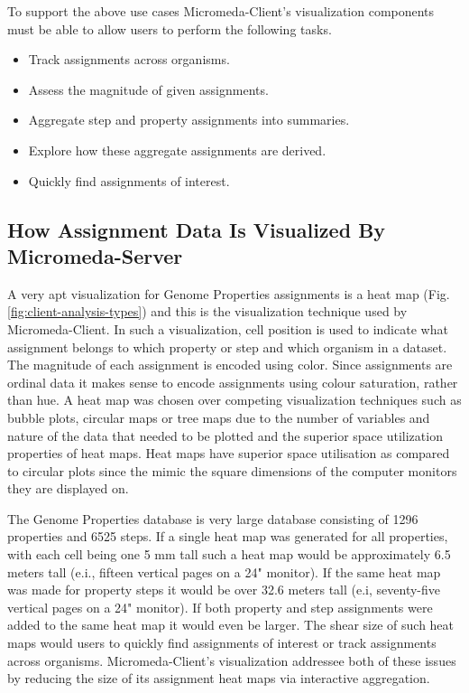 To support the above use cases Micromeda-Client's visualization components must be able to allow users to perform the following tasks.

\begin{itemize}
\item Track assignments across organisms.
\item Assess the magnitude of given assignments.
\item Aggregate step and property assignments into summaries.
\item Explore how these aggregate assignments are derived.
\item Quickly find assignments of interest.
\end{itemize}

\subsection{How Assignment Data Is Visualized By Micromeda-Server}

A very apt visualization for Genome Properties assignments is a heat map (Fig. \ref{fig:client-analysis-types}) and this is the visualization technique used by Micromeda-Client. In such a visualization, cell position is used to indicate what assignment belongs to which property or step and which organism in a dataset. The magnitude of each assignment is encoded using color. Since assignments are ordinal data it makes sense to encode assignments using colour saturation, rather than hue. A heat map was chosen over competing visualization techniques such as bubble plots, circular maps or tree maps due to the number of variables and nature of the data that needed to be plotted and the superior space utilization properties of heat maps. Heat maps have superior space utilisation as compared to circular plots since the mimic the square dimensions of the computer monitors they are displayed on.

The Genome Properties database is very large database consisting of 1296 properties and 6525 steps. If a single heat map was generated for all properties, with each cell being one 5 mm tall such a heat map would be approximately 6.5 meters tall (e.i., fifteen vertical pages on a 24" monitor). If the same heat map was made for property steps it would be over 32.6 meters tall (e.i, seventy-five vertical pages on a 24" monitor). If both property and step assignments were added to the same heat map it would even be larger. The shear size of such heat maps would users to quickly find assignments of interest or track assignments across organisms. Micromeda-Client's visualization addressee both of these issues by reducing the size of its assignment heat maps via interactive aggregation.

